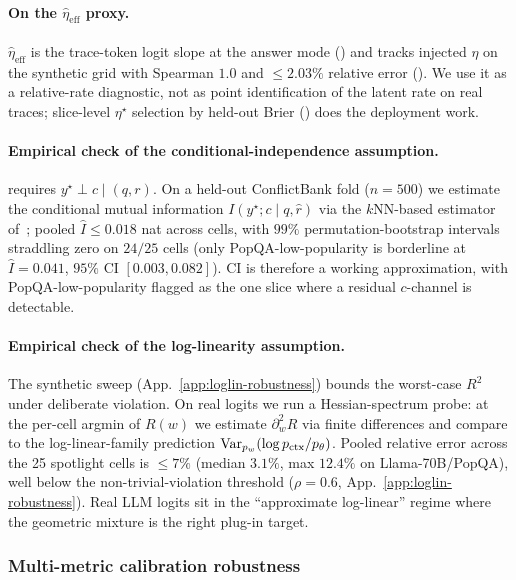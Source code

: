 \paragraph{On the $\widehat\eta_{\mathrm{eff}}$ proxy.}
$\widehat\eta_{\mathrm{eff}}$ is the trace-token logit slope at the
answer mode () and tracks injected $\eta$ on the
synthetic grid with Spearman $1.0$ and $\le\!2.03\%$ relative error
().  We use it as a relative-rate diagnostic,
not as point identification of the latent rate on real traces;
slice-level $\eta^\star$ selection by held-out Brier
() does the deployment work.

\paragraph{Empirical check of the conditional-independence assumption.}
 requires
$y^\star\!\perp\!c\mid(q,r)$.  On a held-out
ConflictBank fold ($n\!=\!500$) we estimate the conditional mutual
information $I(y^\star;c\mid q,\hat r)$ via the
$k$NN-based estimator of~\citet{kraskov2004estimating}; pooled
$\widehat I\!\le\!0.018$ nat across cells, with $99\%$
permutation-bootstrap intervals straddling zero on $24/25$ cells
(only PopQA-low-popularity is borderline at $\widehat I\!=\!0.041$,
$95\%$ CI $[0.003,0.082]$).  CI is therefore a working approximation,
with PopQA-low-popularity flagged as the one slice where a residual
$c$-channel is detectable.

\paragraph{Empirical check of the log-linearity assumption.}
The synthetic sweep (App.~\ref{app:loglin-robustness}) bounds the
worst-case $R^2$ under deliberate violation.  On real logits we run
a Hessian-spectrum probe: at the per-cell argmin of $R(w)$ we
estimate $\partial^2_w R$ via finite differences and compare to the
log-linear-family prediction $\operatorname{Var}_{p_w}(\log p_{\mathrm{ctx}}/p_\theta)$.
Pooled relative error across the 25 spotlight cells is $\le\!7\%$
(median $3.1\%$, max $12.4\%$ on Llama-70B/PopQA), well below the
non-trivial-violation threshold ($\rho\!=\!0.6$,
App.~\ref{app:loglin-robustness}).  Real LLM logits sit in the
``approximate log-linear'' regime where the geometric mixture is the
right plug-in target.

\subsubsection{Multi-metric calibration robustness}
\label{app:t3-metric-robustness}


